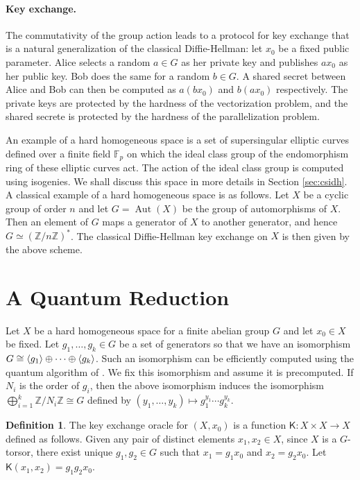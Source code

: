 \documentclass[11pt]{article}
\theoremstyle{plain}
\theoremstyle{definition}
\newtheorem{definition}[theorem]{Definition}
\DeclareMathOperator{\aut}{Aut}
\DeclarePairedDelimiter{\lrang}{\langle}{\rangle}
\def\Z{\mathbb{Z}}
\def\F{\mathbb{F}}
\newcommand{\kex}{\mathsf{K}}
\begin{document}
\paragraph{Key exchange.}
The commutativity of the group action leads to a protocol for key exchange that is a natural 
generalization of the classical Diffie-Hellman: let $x_0$ be a fixed public parameter. Alice selects 
a random $a \in G$ as her private key and publishes $ax_0$ as her public key. Bob does the same for 
a random $b \in G$. A shared secret between Alice and Bob can then be computed as $a(bx_0)$ and 
$b(ax_0)$ respectively. The private keys are protected by the hardness of the vectorization problem, 
and the shared secrete is protected by the hardness of the parallelization problem. 

An example of a hard homogeneous space is a set of supersingular elliptic curves defined over a 
finite field $\F_p$ on which the ideal class group of the endomorphism ring of these elliptic curves 
act. The action of the ideal class group is computed using isogenies. We shall discuss this space in 
more details in Section \ref{sec:csidh}. A classical example of a hard homogeneous space is as 
follows. Let $X$ be a cyclic group of order $n$ and let $G = \aut(X)$ be the group of automorphisms 
of $X$. Then an element of $G$ maps a generator of $X$ to another generator, and hence $G \simeq (\Z 
/ n\Z)^*$. The classical Diffie-Hellman key exchange on $X$ is then given by the above scheme.





\section{A Quantum Reduction}

Let $X$ be a hard homogeneous space for a finite abelian group $G$ and let $x_0 \in X$ be fixed. Let 
$g_1, \dots, g_k \in G$ be a set of generators so that we have an isomorphism $G \cong \lrang{g_1} 
\oplus \cdots \oplus \lrang{g_k}$. Such an isomorphism can be efficiently computed using the quantum
algorithm of \cite{cheung2001decomposing}. We fix this isomorphism and assume it is precomputed. If 
$N_i$ is the order of $g_i$, then the above isomorphism induces the isomorphism $\bigoplus_{i = 1}^k 
\Z / N_i \Z \cong G$ defined by $(y_1, \dots, y_k) \mapsto g_1^{y_1} \cdots g_k^{y_k}$.

\begin{definition}
	The key exchange oracle for $(X, x_0)$ is a function $\kex: X \times X \rightarrow X$ defined as 
	follows. Given any pair of distinct elements $x_1, x_2 \in X$, since $X$ is a $G$-torsor, there 
	exist unique $g_1, g_2 \in G$ such that $x_1 = g_1x_0$ and $x_2 = g_2x_0$. Let $\kex(x_1, x_2) = 
	g_1g_2x_0$.
\end{definition}
\end{document}
